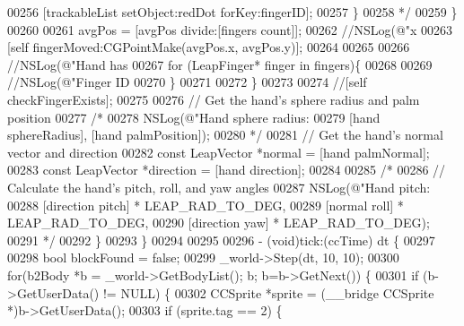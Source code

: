\begin{DoxyCode}
{00256 \textcolor{comment}{                    [trackableList setObject:redDot forKey:fingerID];}
00257 \textcolor{comment}{                \}}
00258 \textcolor{comment}{                 */}
00259             \}
00260             
00261             avgPos = [avgPos divide:[fingers count]];
00262             \textcolor{comment}{//NSLog(@"x %
00263             [\textcolor{keyword}{self} fingerMoved:CGPointMake(avgPos.x, avgPos.y)];
00264             
00265             
00266             \textcolor{comment}{//NSLog(@"Hand has %
00267             \textcolor{keywordflow}{for} (LeapFinger* finger in fingers)\{
00268                 
00269                 \textcolor{comment}{//NSLog(@"Finger ID %
00270             \}
00271             
00272         \}
00273         
00274         \textcolor{comment}{//[self checkFingerExists];}
00275         
00276         \textcolor{comment}{// Get the hand's sphere radius and palm position}
00277         \textcolor{comment}{/*}
00278 \textcolor{comment}{         NSLog(@"Hand sphere radius: %
00279 \textcolor{comment}{         [hand sphereRadius], [hand palmPosition]);}
00280 \textcolor{comment}{         */}
00281         \textcolor{comment}{// Get the hand's normal vector and direction}
00282         \textcolor{keyword}{const} LeapVector *normal = [hand palmNormal];
00283         \textcolor{keyword}{const} LeapVector *direction = [hand direction];
00284         
00285         \textcolor{comment}{/*}
00286 \textcolor{comment}{         // Calculate the hand's pitch, roll, and yaw angles}
00287 \textcolor{comment}{         NSLog(@"Hand pitch: %
00288 \textcolor{comment}{         [direction pitch] * LEAP\_RAD\_TO\_DEG,}
00289 \textcolor{comment}{         [normal roll] * LEAP\_RAD\_TO\_DEG,}
00290 \textcolor{comment}{         [direction yaw] * LEAP\_RAD\_TO\_DEG);}
00291 \textcolor{comment}{         */}
00292     \}
00293 \}
00294 
00295 
00296 - (void)tick:(ccTime) dt \{
00297     
00298     \textcolor{keywordtype}{bool} blockFound = \textcolor{keyword}{false};
00299     \_world->Step(dt, 10, 10);    
00300     \textcolor{keywordflow}{for}(b2Body *b = \_world->GetBodyList(); b; b=b->GetNext()) \{    
00301         \textcolor{keywordflow}{if} (b->GetUserData() != NULL) \{
00302             CCSprite *sprite = (\_\_bridge CCSprite *)b->GetUserData();     
00303             \textcolor{keywordflow}{if} (sprite.tag == 2) \{
}}}}}}
\end{DoxyCode}

